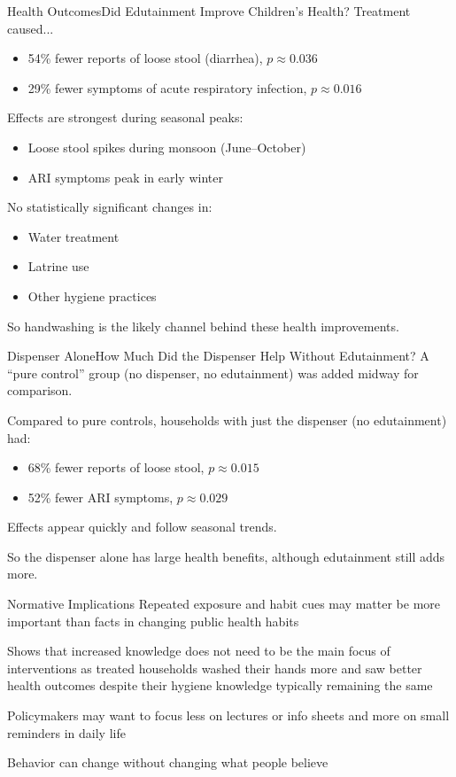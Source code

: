 \documentclass[aspectratio=169]{beamer}
\begin{document}
\begin{frame}{Health Outcomes}{Did Edutainment Improve Children's Health?}
	Treatment caused...
	\begin{itemize}
		\item 54\% fewer reports of loose stool (diarrhea), $p \approx 0.036$
		\item 29\% fewer symptoms of acute respiratory infection, $p \approx 0.016$
	\end{itemize}


	Effects are strongest during seasonal peaks:
	\begin{itemize}
		\item Loose stool spikes during monsoon (June–October)
		\item ARI symptoms peak in early winter
	\end{itemize}


	No statistically significant changes in:
	\begin{itemize}
		\item Water treatment
		\item Latrine use
		\item Other hygiene practices
	\end{itemize}

	So handwashing is the likely channel behind these health improvements.
\end{frame}

\begin{frame}{Dispenser Alone}{How Much Did the Dispenser Help Without Edutainment?}
	A “pure control” group (no dispenser, no edutainment) was added midway for comparison.

	Compared to pure controls, households with just the dispenser (no edutainment) had:
	\begin{itemize}
		\item 68\% fewer reports of loose stool, $p \approx 0.015$
		\item 52\% fewer ARI symptoms, $p \approx 0.029$
	\end{itemize}

	Effects appear quickly and follow seasonal trends.

	So the dispenser alone has large health benefits, although edutainment still adds more.
\end{frame}

\begin{frame}{Normative Implications}
	Repeated exposure and habit cues may matter be more important than facts in changing public health habits

	Shows that increased knowledge does not need to be the main focus of interventions as treated households washed their hands more and saw better health outcomes despite their hygiene knowledge typically remaining the same 

	Policymakers may want to focus less on lectures or info sheets and more on small reminders in daily life

	Behavior can change without changing what people believe
\end{frame}
\end{document}
